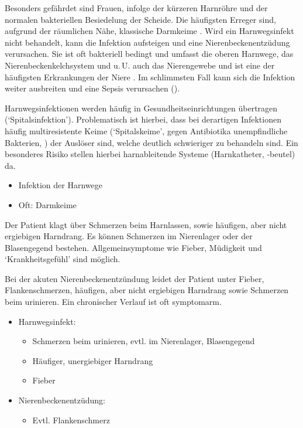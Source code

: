 \documentclass[
ngerman,
paper=a4,
asymmetric,
fontsize=10pt,
draft=false,
numbers=noenddot,
bibtotocnumbered,
footnotes=multiple,
]{scrreprt}
\begin{document}
\TextSlide{\TxBeschreibung}
{%
 Besonders gefährdet sind
Frauen, infolge der kürzeren Harnröhre und der
normalen bakteriellen Besiedelung der Scheide. Die
häufigsten Erreger sind, aufgrund der räumlichen
Nähe, klassische Darmkeime .
Wird ein Harnwegsinfekt nicht behandelt, kann die
Infektion aufsteigen und eine Nierenbeckenentzüdung
verursachen.  
Sie ist oft bakteriell bedingt 
und umfasst die oberen Harnwege, das Nierenbeckenkelchsystem
und u.\,U. auch das Nierengewebe und ist eine der häufigsten
Erkrankungen der Niere \cite{Pschy259}. 
Im schlimmsten Fall kann sich
die Infektion weiter ausbreiten und eine Sepsis
verursachen ().

Harnwegsinfektionen werden häufig in
Gesundheitseinrichtungen übertragen
(\enquote*{Spitalsinfektion}).
Problematisch ist hierbei, dass bei derartigen Infektionen
häufig multiresistente Keime (\enquote*{Spitalskeime},
gegen Antibiotika unempfindliche Bakterien,
) der Auslöser
sind, welche deutlich schwieriger zu behandeln sind. Ein
besonderes Risiko stellen hierbei harnableitende Systeme
(Harnkatheter, -beutel) da.
}
{%
\begin{itemize}
  \item Infektion der Harnwege
  \item Oft: Darmkeime
\end{itemize}
}
{}
{}
{}



\TextSlide{\TxSymptome}
{Der Patient klagt über Schmerzen beim Harnlassen, sowie
häufigen, aber nicht ergiebigen Harndrang. Es können
Schmerzen im Nierenlager oder der Blasengegend bestehen.
Allgemeinsymptome wie Fieber, Müdigkeit und
\enquote*{Krankheitsgefühl} sind möglich. 

Bei der akuten
Nierenbeckenentzündung leidet der Patient unter Fieber,
Flankenschmerzen, häufigen, aber nicht ergiebigen Harndrang
sowie Schmerzen beim urinieren. Ein chronischer Verlauf ist 
oft symptomarm.
}
{
\begin{itemize}
  \item Harnwegsinfekt:
  \begin{itemize}
    \item Schmerzen beim urinieren, evtl. im Nierenlager,
    Blasengegend
    \item Häufiger, unergiebiger Harndrang
    \item Fieber
  \end{itemize}
  \item Nierenbeckenentzüdung:
  \begin{itemize}
    \item Evtl. Flankenschmerz
  \end{itemize}
\end{itemize}
}
{}
{}
{}
\end{document}
